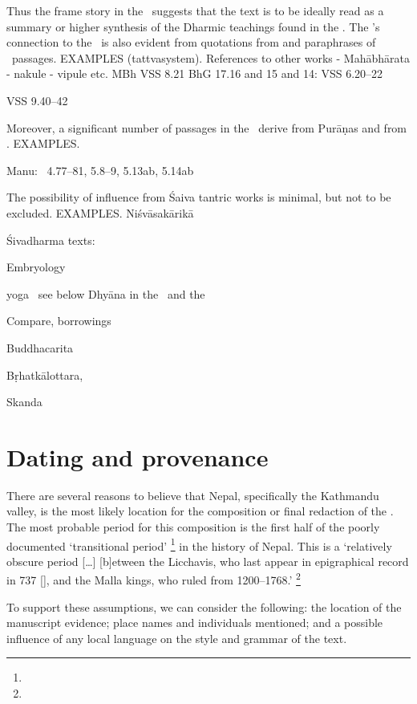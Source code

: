 \noindent
Thus the frame story in the \VSS\ suggests
that the text is to be ideally read as a summary 
or higher synthesis of the Dharmic teachings found
in the \MBH. The \VSS's connection to the \MBH\
is also evident from quotations from and paraphrases
of \MBH\ passages. EXAMPLES (tattvasystem).
  References to other works - Mahābhārata - nakule - vipule etc.
MBh VSS 8.21
BhG 17.16 and 15 and 14: VSS 6.20--22

VSS 9.40--42
	
Moreover, a significant number of passages in 
the \VSS\ derive from Purāṇas and from \Manu. EXAMPLES.

Manu: \VSS\ 4.77--81, 5.8--9, 5.13ab, 5.14ab

The possibility of influence from Śaiva tantric works is
minimal, but not to be excluded. EXAMPLES.
Niśvāsakārikā



Śivadharma texts:
\label{vss_connection_other_sd_texts}


Embryology

yoga \DharmP\ see below
Dhyāna in the \VSS\ and the \DHARMP
\label{dharmaputrika}

Compare, borrowings

Buddhacarita 

Bṛhatkālottara,

Skanda







\section{Dating and provenance}
\label{provenance}
There are several reasons to believe that
Nepal, specifically the Kathmandu valley, is the most
likely location for the composition
or final redaction of the \VSS. 
The most probable period for this composition is 
the first half of the poorly documented `transitional period'%
	\footnote{}
in the history of Nepal. 
This is a `relatively obscure period [\dots]
[b]etween the Licchavis, who last appear 
in epigraphical record in 737 [\CE], 
and the Malla kings, who ruled from 1200--1768.'%
	\footnote{}

To support these assumptions, we can consider the following:
the location of the manuscript evidence;
place names and individuals mentioned;
and a possible influence of any local language on
the style and grammar of the text.

